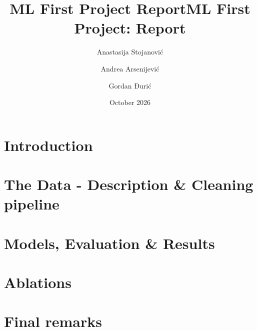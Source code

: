 \documentclass{llncs}
\title{ML First Project Report}
\date{October 2026}
\begin{document}
\title{ML First Project: Report}

\author{Anastasija Stojanović \and
Andrea Arsenijević \and
Gordan Đurić}



\maketitle

\section{Introduction}


\section{The Data - Description \& Cleaning pipeline}


\section{Models, Evaluation \& Results}


\section{Ablations}


\section{Final remarks}




\end{document}
